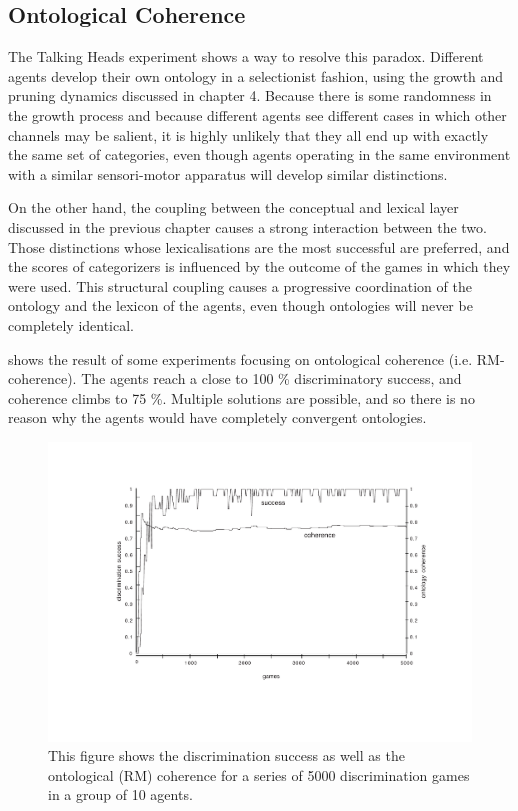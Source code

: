 \subsection{Ontological Coherence}

The Talking Heads experiment shows a way to resolve
this paradox. Different agents develop their own 
ontology in a selectionist fashion,
using the growth and pruning dynamics discussed in chapter 4. 
Because there is some randomness in the growth
process and because different agents see different cases
in which other channels may be salient, it is highly
unlikely that they all end up with exactly the same 
set of categories, even though 
agents operating in the same environment with a similar 
sensori-motor apparatus will develop similar distinctions. 

On the other hand, the coupling between the conceptual
and lexical layer discussed in the previous chapter
causes a strong interaction between the two. Those 
distinctions whose lexicalisations are the most successful 
are preferred, and the scores
of categorizers is influenced by the outcome of the 
games in which they were used. This structural coupling
causes a progressive coordination of the ontology and 
the lexicon of the agents, even though ontologies will 
never be completely identical. 

 shows the result of some experiments 
focusing on ontological coherence (i.e. RM-coherence). 
The agents reach a close to 100 \% discriminatory 
success, and coherence climbs to 75 \%. 
Multiple solutions are possible, and so there is no reason why the 
agents would have completely convergent ontologies.
\begin{figure}[htbp]
  \centerline{\includegraphics[width=.80\textwidth]{chap7/figs/coh}}
\caption{\label{coh} This figure shows the discrimination
success as well as the ontological (RM) coherence for
a series of 5000 discrimination games in a group of 10 agents.}
\end{figure}

